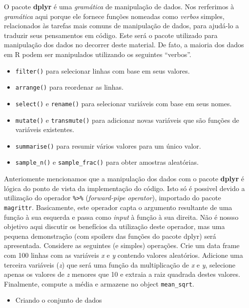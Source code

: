 \documentclass[
]{book}
\providecommand{\tightlist}{%
  \setlength{\itemsep}{0pt}\setlength{\parskip}{0pt}}
\begin{document}
O pacote \textbf{dplyr} é uma \emph{gramática} de manipulação de dados. Nos rerferimos à \emph{gramática} aqui porque ele fornece funções nomeadas como \emph{verbos} simples, relacionados às tarefas mais comuns de manipulação de dados, para ajudá-lo a traduzir seus pensamentos em código. Este será o pacote utilizado para manipulação dos dados no decorrer deste material. De fato, a maioria dos dados em R podem ser manipulados utilizando os seguintes ``verbos''.

\begin{itemize}
\tightlist
\item
  \texttt{filter()} para selecionar linhas com base em seus valores.
\item
  \texttt{arrange()} para reordenar as linhas.
\item
  \texttt{select()} e \texttt{rename()} para selecionar variáveis com base em seus nomes.
\item
  \texttt{mutate()} e \texttt{transmute()} para adicionar novas variáveis que são funções de variáveis existentes.
\item
  \texttt{summarise()} para resumir vários valores para um único valor.
\item
  \texttt{sample\_n()} e \texttt{sample\_frac()} para obter amostras aleatórias.
\end{itemize}

Anteriomente mencionamos que a manipulação dos dados com o pacote \textbf{dplyr} é lógica do ponto de vista da implementação do código. Isto só é possivel devido a utilização do operador \texttt{\%\textgreater{}\%} (\emph{forward-pipe operator}), importado do pacote \texttt{magrittr}. Basicamente, este operador capta o argumento resultante de uma função à sua esquerda e passa como \emph{input} à função à sua direita. Não é nossso objetivo aqui discutir os benefícios da utilização deste operador, mas uma pequena demonstração (com spoilers das funções do pacote dplyr) será apresentada. Considere as seguintes (e simples) operações. Crie um data frame com 100 linhas com as variáveis \emph{x} e \emph{y} contendo valores aleatórios. Adicione uma terceira variáveis (\emph{z}) que será uma função da multiplicação de \emph{x} e \emph{y}, selecione apenas os valores de \emph{z} menores que 10 e extraia a raiz quadrada destes valores. Finalmente, compute a média e armazene no object \texttt{mean\_sqrt}.

\begin{itemize}
\tightlist
\item
  Criando o conjunto de dados
\end{itemize}
\end{document}
